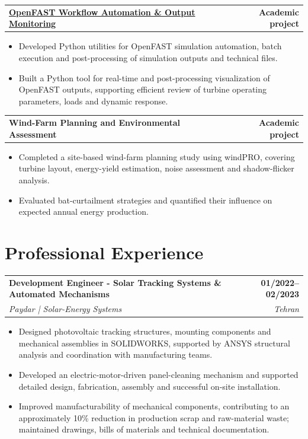 \documentclass[10pt,a4paper]{article}
\makeatletter
\newcommand{\cvjob}[4]{%
  \begin{tabularx}{\linewidth}{@{}Xr@{}}
    \textbf{#1} & \textbf{#2}\\[1pt]
    \textit{#3} & \textit{#4}
  \end{tabularx}
  \vspace{0.05em}
}
\newcommand{\cvproject}[2]{%
  \begin{tabularx}{\linewidth}{@{}Xr@{}}
    \textbf{#1} & \textbf{#2}
  \end{tabularx}
  \vspace{0.08em}
}
\makeatother
\begin{document}
\cvproject
  {\href{REPLACEPROJECTLINK}
  {OpenFAST Workflow Automation \& Output Monitoring}}
  {Academic project}
\begin{itemize}
  \item Developed Python utilities for OpenFAST simulation automation, batch execution and post-processing of simulation outputs and technical files.
  \item Built a Python tool for real-time and post-processing visualization of OpenFAST outputs, supporting efficient review of turbine operating parameters, loads and dynamic response.
\end{itemize}

\cvproject{Wind-Farm Planning and Environmental Assessment}{Academic project}
\begin{itemize}
  \item Completed a site-based wind-farm planning study using windPRO, covering turbine layout, energy-yield estimation, noise assessment and shadow-flicker analysis.
  \item Evaluated bat-curtailment strategies and quantified their influence on expected annual energy production.
\end{itemize}


\section{Professional Experience}
\cvjob{Development Engineer - Solar Tracking Systems \& Automated Mechanisms}{01/2022--02/2023}{Paydar | Solar-Energy Systems}{Tehran}
\begin{itemize}
  \item Designed photovoltaic tracking structures, mounting components and mechanical assemblies in SOLIDWORKS, supported by ANSYS structural analysis and coordination with manufacturing teams.
  \item Developed an electric-motor-driven panel-cleaning mechanism and supported detailed design, fabrication, assembly and successful on-site installation.
  \item Improved manufacturability of mechanical components, contributing to an approximately 10\% reduction in production scrap and raw-material waste; maintained drawings, bills of materials and technical documentation.
\end{itemize}
\vspace{1pt}
\end{document}
